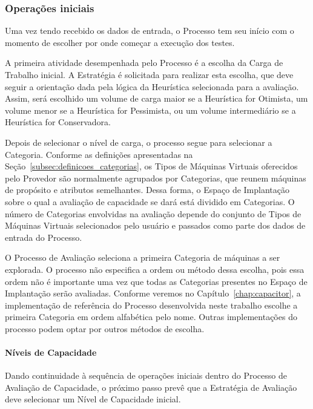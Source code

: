 \documentclass[12pt]{article}
\begin{document}
\subsubsection{Operações iniciais}
\label{subsec:processo_operacoes_iniciais}
Uma vez tendo recebido os dados de entrada, o Processo tem seu início com o momento 
de escolher por onde começar a execução dos testes.

A primeira atividade desempenhada pelo Processo é a escolha da Carga de Trabalho
inicial. A Estratégia é solicitada para realizar esta escolha, que deve
seguir a orientação dada pela lógica da Heurística selecionada para 
a avaliação. Assim, será escolhido
um volume de carga maior se a Heurística for Otimista, um volume menor se a
Heurística for Pessimista, ou um volume intermediário se a Heurística for Conservadora. 

Depois de selecionar o nível de carga, o processo segue para selecionar a
Categoria. Conforme as definições apresentadas na Seção~\ref{subsec:definicoes_categorias}, 
os Tipos de Máquinas Virtuais oferecidos pelo Provedor são normalmente agrupados 
por Categorias, que reunem máquinas de propósito e atributos semelhantes. Dessa
forma, o Espaço de Implantação sobre o qual a avaliação de capacidade se dará está 
dividido em Categorias. O número de Categorias envolvidas na avaliação depende do 
conjunto de Tipos de Máquinas Virtuais selecionados pelo usuário e passados como
parte dos dados de entrada do Processo.

O Processo de Avaliação seleciona a primeira
Categoria de máquinas a ser explorada. O processo não especifica a ordem ou método 
dessa escolha, pois essa ordem não é importante uma vez que todas as Categorias 
presentes no Espaço de Implantação serão avaliadas. Conforme veremos no 
Capítulo~\ref{chap:capacitor}, a implementação de referência do Processo 
desenvolvida neste trabalho escolhe a primeira Categoria em ordem alfabética pelo
nome. Outras implementações do processo podem optar por outros métodos de
escolha.



\paragraph{Níveis de Capacidade}
\label{subsec:processo_niveis_capacidade}
Dando continuidade à sequência de operações iniciais dentro do Processo de Avaliação 
de Capacidade, o próximo passo prevê que a Estratégia de Avaliação deve selecionar 
um Nível de Capacidade inicial. 
\end{document}
